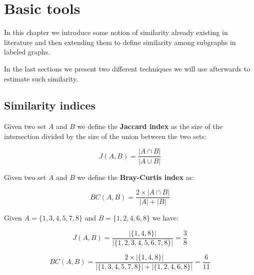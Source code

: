 
\chapter{Basic tools}

In this chapter we introduce some notion of similarity already existing in literature and then extending them to define similarity among subgraphs in labeled graphs.

In the last sections we present two different techniques we will use afterwards to estimate such similarity.

\section{Similarity indices}

\begin{definizione}\label{def:jaccard}
    Given two set $A$ and $B$ we define the \textbf{Jaccard index} as the size of the intersection divided by the size of the union between the two sets:
    
    \begin{equation}
    J(A,B) = \frac{|A \cap B|}{|A \cup B|}
    \end{equation}
    
\end{definizione}

\begin{definizione}\label{def:bray}
    Given two set $A$ and $B$ we define the \textbf{Bray-Curtis index} as:
    
    \begin{equation}
    BC(A,B) = \frac{2 \times |A \cap B|}{|A| + |B|}
    \end{equation}
    
\end{definizione}

\begin{esempio}
	Given $A = \{1, 3, 4, 5, 7, 8\}$ and $B = \{1, 2, 4, 6, 8\}$ we have:
	
	\begin{equation}
	J(A,B) = \frac{|\{1, 4, 8\}|}{|\{1, 2, 3, 4, 5, 6, 7, 8\}|} = \frac{3}{8} 
	\end{equation}
	
	\begin{equation}
	BC(A,B) = \frac{2 \times |\{1, 4, 8\}|}{|\{1, 3, 4, 5, 7, 8\}| + |\{1, 2, 4, 6, 8\}|} = \frac{6}{11} 
	\end{equation}
\end{esempio}



